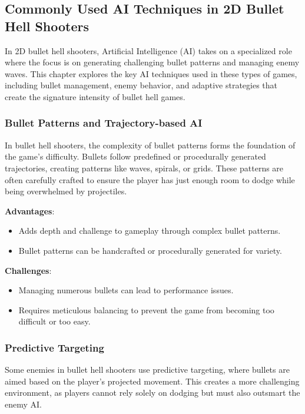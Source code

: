 \subsection{Commonly Used AI Techniques in 2D Bullet Hell Shooters}

In 2D bullet hell shooters, Artificial Intelligence (AI) takes on a specialized role where the focus is on generating challenging bullet patterns and managing enemy waves. This chapter explores the key AI techniques used in these types of games, including bullet management, enemy behavior, and adaptive strategies that create the signature intensity of bullet hell games.

\subsubsection{Bullet Patterns and Trajectory-based AI}

In bullet hell shooters, the complexity of bullet patterns forms the foundation of the game's difficulty. Bullets follow predefined or procedurally generated trajectories, creating patterns like waves, spirals, or grids. These patterns are often carefully crafted to ensure the player has just enough room to dodge while being overwhelmed by projectiles.

\textbf{Advantages}:
\begin{itemize}
    \item Adds depth and challenge to gameplay through complex bullet patterns.
    \item Bullet patterns can be handcrafted or procedurally generated for variety.
\end{itemize}

\textbf{Challenges}:
\begin{itemize}
    \item Managing numerous bullets can lead to performance issues.
    \item Requires meticulous balancing to prevent the game from becoming too difficult or too easy.
\end{itemize}

\subsubsection{Predictive Targeting}

Some enemies in bullet hell shooters use predictive targeting, where bullets are aimed based on the player's projected movement. This creates a more challenging environment, as players cannot rely solely on dodging but must also outsmart the enemy AI.

